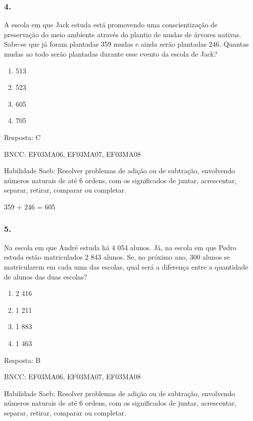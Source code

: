 \subsubsection{4.}\label{section-129}

A escola em que Jack estuda está promovendo uma conscientização de
preservação do meio ambiente através do plantio de mudas de árvores
nativas. Sabe-se que já foram plantadas 359 mudas e ainda serão
plantadas 246. Quantas mudas ao todo serão plantadas durante esse evento
da escola de Jack?

\begin{enumerate}
\def\labelenumi{\alph{enumi})}
\item
  513
\item
  523
\item
  605
\item
  705
\end{enumerate}

Resposta: C

BNCC: EF03MA06, EF03MA07, EF03MA08

Habilidade Saeb: Resolver problemas de adição ou de subtração,
envolvendo números naturais de até 6 ordens, com os significados de
juntar, acrescentar, separar, retirar, comparar ou completar.

359 + 246 = 605

\subsubsection{5.}\label{section-130}

Na escola em que André estuda há 4 054 alunos. Já, na escola em que
Pedro estuda estão matriculados 2 843 alunos. Se, no próximo ano, 300
alunos se matricularem em cada uma das escolas, qual será a diferença
entre a quantidade de alunos das duas escolas?

\begin{enumerate}
\def\labelenumi{\alph{enumi})}
\item
  2 416
\item
  1 211
\item
  1 883
\item
  1 463
\end{enumerate}

Resposta: B

BNCC: EF03MA06, EF03MA07, EF03MA08

Habilidade Saeb: Resolver problemas de adição ou de subtração,
envolvendo números naturais de até 6 ordens, com os significados de
juntar, acrescentar, separar, retirar, comparar ou completar.

